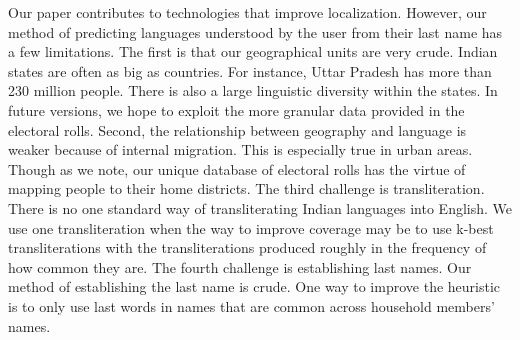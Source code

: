 \documentclass[11pt,  letterpaper]{article}
\begin{document}
Our paper contributes to technologies that improve localization. However, our method of predicting languages understood by the user from their last name has a few limitations. The first is that our geographical units are very crude. Indian states are often as big as countries. For instance, Uttar Pradesh has more than 230 million people. There is also a large linguistic diversity within the states. In future versions, we hope to exploit the more granular data provided in the electoral rolls. Second, the relationship between geography and language is weaker because of internal migration. This is especially true in urban areas. Though as we note, our unique database of electoral rolls has the virtue of mapping people to their home districts. The third challenge is transliteration. There is no one standard way of transliterating Indian languages into English. We use one transliteration when the way to improve coverage may be to use k-best transliterations with the transliterations produced roughly in the frequency of how common they are. The fourth challenge is establishing last names. Our method of establishing the last name is crude. One way to improve the heuristic is to only use last words in names that are common across household members’ names.

\newpage


\end{document}

